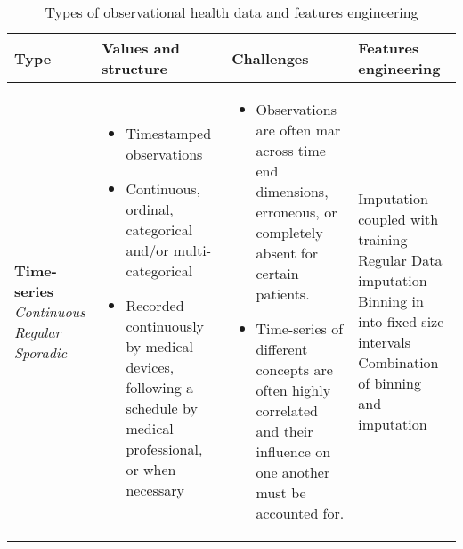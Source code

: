     \begin{table}[H]
        \footnotesize
        \caption{Types of observational health data and features engineering}\label{tab:features}
    
        \begin{tabularx}{\textwidth}{@{}p{}p{}p{}X@{}} \toprule
            Type & Values and structure & Challenges & Features engineering\\ \midrule
            
            \textbf{Time-series}\newline
            \textit{Continuous}\newline 
            \textit{Regular}\newline
            \textit{Sporadic}
            &\begin{minipage}[t]{0.3\textwidth}{
            \begin{itemize}[leftmargin=*]  
                \item Timestamped observations 
                \item Continuous, ordinal, categorical and/or multi-categorical
                \item Recorded continuously by medical devices, following a schedule by medical professional, or when necessary
            \end{itemize}}
            \end{minipage}
            &\begin{minipage}[t]{0.3\textwidth}{
            \begin{itemize}[leftmargin=*]  
                \item Observations are often \gls{mar} across time end dimensions, erroneous, or completely absent for certain patients.
                \item Time-series of different concepts are often highly correlated and their influence on one another must be accounted for.
             \end{itemize}}
             \end{minipage}
            & Imputation coupled with training \newline Regular \newline Data imputation \newline Binning in into fixed-size intervals \newline Combination of binning and imputation \\
            

\end{tabularx}
\end{table}
